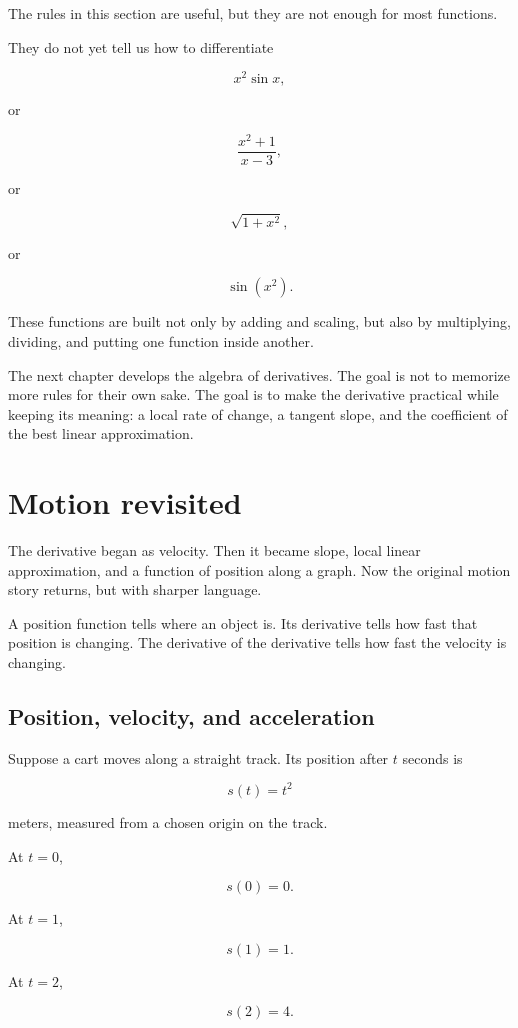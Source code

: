 The rules in this section are useful, but they are not enough for most functions.

They do not yet tell us how to differentiate

\[
x^2\sin x,
\]

or

\[
\frac{x^2+1}{x-3},
\]

or

\[
\sqrt{1+x^2},
\]

or

\[
\sin(x^2).
\]

These functions are built not only by adding and scaling, but also by multiplying, dividing, and putting one function inside another.

The next chapter develops the algebra of derivatives.  The goal is not to memorize more rules for their own sake.  The goal is to make the derivative practical while keeping its meaning: a local rate of change, a tangent slope, and the coefficient of the best linear approximation.
\section{Motion revisited}
\label{sec:motion-revisited}

The derivative began as velocity.  Then it became slope, local linear approximation, and a function of position along a graph.  Now the original motion story returns, but with sharper language.

A position function tells where an object is.  Its derivative tells how fast that position is changing.  The derivative of the derivative tells how fast the velocity is changing.

\subsection{Position, velocity, and acceleration}
\label{subsec:position-velocity-acceleration}

Suppose a cart moves along a straight track.  Its position after \(t\) seconds is

\[
s(t)=t^2
\]

meters, measured from a chosen origin on the track.

At \(t=0\),

\[
s(0)=0.
\]

At \(t=1\),

\[
s(1)=1.
\]

At \(t=2\),

\[
s(2)=4.
\]

